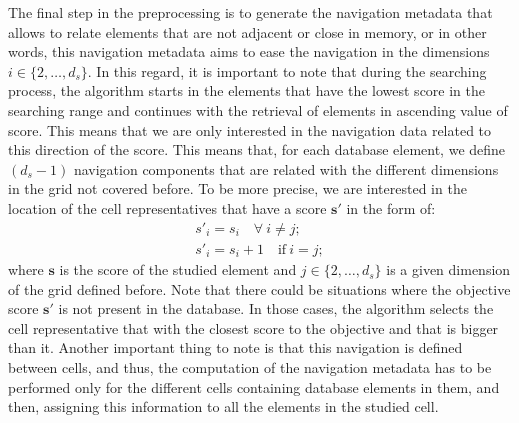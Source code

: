 \documentclass[preprint,12pt]{elsarticle}
\begin{document}
The final step in the preprocessing is to generate the navigation metadata that allows to relate elements that are not adjacent or close in memory, or in other words, this navigation metadata aims to ease the navigation in the dimensions $i\in\{2,\dots,d_s\}$. In this regard, it is important to note that during the searching process, the algorithm starts in the elements that have the lowest score in the searching range and continues with the retrieval of elements in ascending value of score. This means that we are only interested in the navigation data related to this direction of the score. This means that, for each database element, we define $(d_s-1)$ navigation components that are related with the different dimensions in the grid not covered before. To be more precise, we are interested in the location of the cell representatives that have a score $\mathbf{s'}$ in the form of:
\begin{eqnarray} \label{eq:cellobjective}
s'_i = s_i \quad \forall \: i \neq j; \nonumber \\
s'_i = s_i + 1 \quad \text{if} \: i = j;
\end{eqnarray}
where $\mathbf{s}$ is the score of the studied element and $j \in \{2, \dots, d_s\}$ is a given dimension of the grid defined before. Note that there could be situations where the objective score $\mathbf{s'}$ is not present in the database. In those cases, the algorithm selects the cell representative that with the closest score to the objective and that is bigger than it. Another important thing to note is that this navigation is defined between cells, and thus, the computation of the navigation metadata has to be performed only for the different cells containing database elements in them, and then, assigning this information to all the elements in the studied cell.
\end{document}
